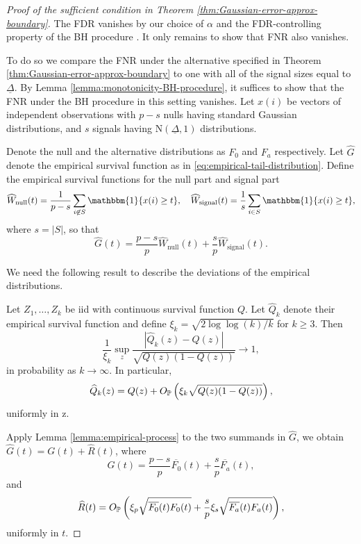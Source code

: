 \begin{proof}[Proof of the sufficient condition in Theorem \ref{thm:Gaussian-error-approx-boundary}]
The FDR vanishes by our choice of $\alpha$ and the FDR-controlling property of the BH procedure \citep{benjamini1995controlling}.
It only remains to show that FNR also vanishes.

To do so we compare the FNR under the alternative specified in Theorem \ref{thm:Gaussian-error-approx-boundary} to one with all of the signal sizes equal to $\underline{\Delta}$.
By Lemma \ref{lemma:monotonicity-BH-procedure}, it suffices to show that the FNR under the BH procedure in this setting vanishes.
Let $x(i)$ be vectors of independent observations with $p-s$ nulls having standard Gaussian distributions, and $s$ signals having $\mathrm{N}(\underline{\Delta}, 1)$ distributions.

Denote the null and the alternative distributions as $F_0$ and $F_{a}$ respectively.
Let $\widehat{G}$ denote the empirical survival function as in \eqref{eq:empirical-tail-distribution}.
Define the empirical survival functions for the null part and signal part
\begin{equation} \label{eq:empirical-survival-null-signal-Gaussian}
    \widehat{W}_\text{null}(t) = \frac{1}{p-s}\sum_{i\not\in S}\mathbbm{1}\{x(i) \ge t\},
    \quad
    \widehat{W}_\text{signal}(t) = \frac{1}{s}\sum_{i\in S}\mathbbm{1}\{x(i) \ge t\},
\end{equation}
where $s=|S|$, so that
$$
\widehat{G}(t) = \frac{p-s}{p}\widehat{W}_\text{null}(t) + \frac{s}{p}\widehat{W}_\text{signal}(t).
$$

We need the following result to describe the deviations of the empirical distributions.
\begin{lemma} \label{lemma:empirical-process}
Let $Z_1,\ldots,Z_k$ be iid with continuous survival function $Q$.
Let $\widehat{Q}_k$ denote their empirical survival function and define 
$\xi_k = \sqrt{2\log{\log{(k)}}/k}$ for $k \ge 3$. 
Then
$$
\frac{1}{\xi_k}\sup_z\frac{|\widehat{Q}_k(z) - Q(z)|}{\sqrt{Q(z)(1 - Q(z))}} \to 1,
$$
in probability as $k \to \infty$.
In particular,
$$
\widehat{Q}_k(z) = Q(z) + O_\P\left(\xi_k\sqrt{Q(z)(1 - Q(z))}\right),
$$
uniformly in z.
\end{lemma}

Apply Lemma \ref{lemma:empirical-process} to the two summands in $\widehat{G}$, we obtain
$\widehat{G}(t) = G(t) + \widehat{R}(t)$,
where 
\begin{equation} \label{eq:empirical-process-mean-Gaussian}
    G(t) = \frac{p-s}{p}\overline{F_0}(t) + \frac{s}{p}\overline{F_a}(t),
\end{equation}
and 
\begin{equation} \label{eq:empirical-process-residual-Gaussian}
    \widehat{R}(t) = O_\P\left(\xi_p\sqrt{\overline{F_0}(t)F_0(t)} + \frac{s}{p}\xi_s\sqrt{\overline{F_a}(t)F_a(t)}\right),
\end{equation}
uniformly in $t$.


\end{proof}
